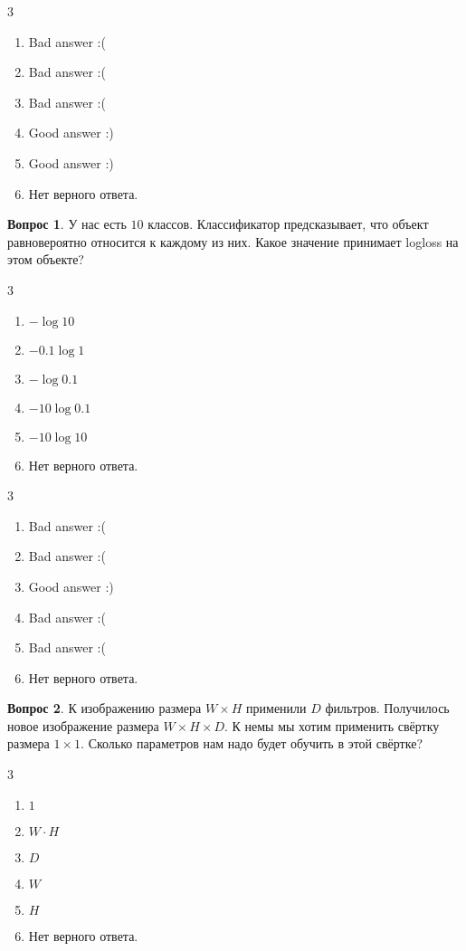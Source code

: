 \documentclass[12pt]{article}
\newenvironment{answerlist}[1][3]{
\begin{multicols}{#1}

\begin{enumerate}[label=\fbox{\emph{\Alph*}},ref=\emph{\alph*}]
}
{
\item Нет верного ответа.
\end{enumerate}
\end{multicols}
}
\theoremstyle{definition}
\newtheorem{question}{Вопрос}
\begin{document}
\begin{solution}
\begin{answerlist}
  \item Bad answer :(
  \item Bad answer :(
  \item Bad answer :(
  \item Good answer :)
  \item Good answer :)
\end{answerlist}
\end{solution}


\begin{question}
У нас есть $10$ классов. Классификатор предсказывает, что объект равновероятно относится к каждому из них. Какое значение принимает logloss на этом объекте? 
\begin{answerlist}
  \item \(-\log 10 \)
  \item \(-0.1 \log 1 \)
  \item \(-\log 0.1 \)
  \item \(-10 \log 0.1 \)
  \item \(-10 \log 10 \)
\end{answerlist}
\end{question}

\begin{solution}
\begin{answerlist}
  \item Bad answer :(
  \item Bad answer :(
  \item Good answer :)
  \item Bad answer :(
  \item Bad answer :(
\end{answerlist}
\end{solution}


\begin{question}
К изображению размера $W \times H$ применили $D$ фильтров. Получилось новое изображение размера $W \times H \times D$. К немы мы хотим применить свёртку размера $1 \times 1.$ Сколько параметров нам надо будет обучить в этой свёртке? 
\begin{answerlist}
  \item  $1$
  \item  $W \cdot H$
  \item  $D$
  \item  $W$
  \item  $H$
\end{answerlist}
\end{question}
\end{document}
